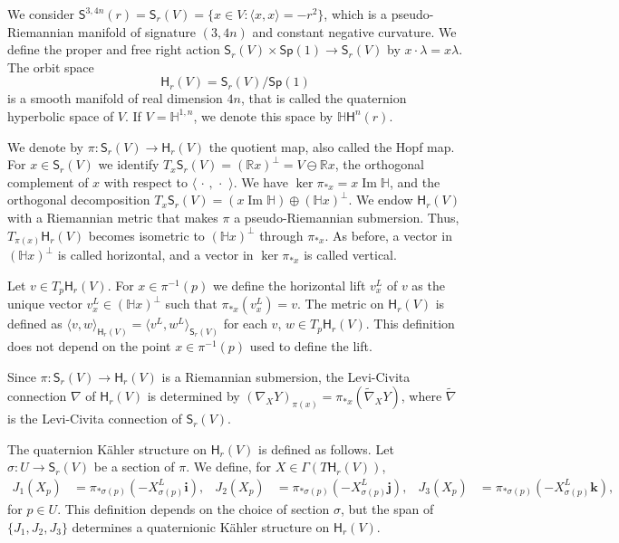 \documentclass[12pt, a4paper,draft]{amsart}
\newcommand{\R}{\mathbb{R}}
\renewcommand{\H}{\mathbb{H}}
\renewcommand{\Im}{\operatorname{Im}}
\newcommand{\Sp}{\mathsf{Sp}}
\theoremstyle{remark}
\begin{document}
We consider $\mathsf{S}^{3,4n}(r)=\mathsf{S}_r(V)=\{{x}\in V:\langle {x},{x}\rangle=-r^2\}$,
which is a pseudo-Riemannian manifold of signature $(3,4n)$ and constant negative curvature.
We define the proper and free right action $\mathsf{S}_r(V)\times\Sp(1)\to\mathsf{S}_r(V)$ by ${x}\cdot \lambda={x}\lambda$.
The orbit space 
\[
\mathsf{H}_r(V)=\mathsf{S}_r(V)/\Sp(1)
\]
is a smooth manifold of real dimension $4n$, that is called the quaternion hyperbolic space of $V$.
If $V=\H^{1,n}$, we denote this space by $\H \mathsf{H}^n(r)$.

We denote by $\pi\colon\mathsf{S}_r(V)\to\mathsf{H}_r(V)$ the quotient map, also called the Hopf map.
For ${x}\in\mathsf{S}_r(V)$ we identify $T_{x}\mathsf{S}_r(V)=(\R{x})^\perp=V\ominus\R{x}$, the orthogonal complement of ${x}$ with respect to $\langle\,\cdot\,,\,\cdot\,\,\rangle$.
We have $\ker\pi_{*{x}}={x}\Im\H$, and the orthogonal decomposition $T_{x}\mathsf{S}_r(V)=({x}\Im\H)\oplus(\H{x})^\perp$.
We endow $\mathsf{H}_r(V)$ with a Riemannian metric that makes $\pi$ a pseudo-Riemannian submersion.
Thus, $T_{\pi({x})}\mathsf{H}_r(V)$ becomes isometric to $(\H{x})^\perp$ through $\pi_{*{x}}$.
As before, a vector in $(\H x)^\perp$ is called horizontal, and a vector in $\ker\pi_{*x}$ is called vertical.

Let $v\in T_{p}\mathsf{H}_r(V)$.
For ${x}\in\pi^{-1}(p)$ we define the horizontal lift $v^L_{x}$ of $v$ as the unique vector $v_x^L\in(\H{x})^\perp$ such that $\pi_{*{x}}(v^L_{x})=v$.
The metric on $\mathsf{H}_r(V)$ is defined as 
$\langle v,w\rangle_{\mathsf{H}_r(V)}=\langle v^L,w^L\rangle_{\mathsf{S}_r(V)}$ 
for each $v$, $w\in T_p\mathsf{H}_r(V)$.
This definition does not depend on the point ${x}\in\pi^{-1}(p)$ used to define the lift.

Since $\pi\colon\mathsf{S}_r(V)\to\mathsf{H}_r(V)$ is a Riemannian submersion, the Levi-Civita connection $\nabla$ of $\mathsf{H}_r(V)$ is determined by
$(\nabla_X Y)_{\pi(x)}=\pi_{*x}(\tilde{\nabla}_X Y)$,
where $\tilde{\nabla}$ is the Levi-Civita connection of $\mathsf{S}_r(V)$.

The quaternion K\"ahler structure on $\mathsf{H}_r(V)$ is defined as follows.
Let $\sigma\colon U\to\mathsf{S}_r(V)$ be a section of $\pi$.
We define, for $X\in\Gamma(T\mathsf{H}_r(V))$,
\[
\begin{aligned}
J_1(X_p)&{}=\pi_{*\sigma(p)}(-X_{\sigma(p)}^L\mathbf{i}),
&J_2(X_p)&{}=\pi_{*\sigma(p)}(-X_{\sigma(p)}^L\mathbf{j}),
&J_3(X_p)&{}=\pi_{*\sigma(p)}(-X_{\sigma(p)}^L\mathbf{k}),
\end{aligned}
\]
for $p\in U$.
This definition depends on the choice of section $\sigma$, but the span of $\{J_1,J_2,J_3\}$ determines a quaternionic K\"ahler structure on $\mathsf{H}_r(V)$.
\end{document}
